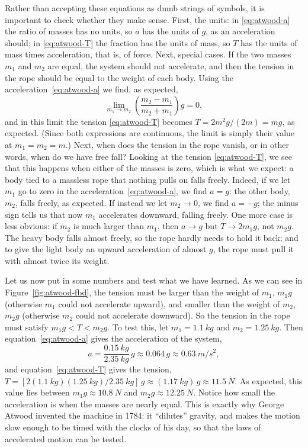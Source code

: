 \documentclass[11pt,a4paper]{article}
\begin{document}
Rather than accepting these equations as dumb strings of symbols, it is important to check whether
they make sense. First, the units: in \eqref{eq:atwood-a} the ratio of masses has no units, so $a$
has the units of $g$, as an acceleration should; in \eqref{eq:atwood-T} the fraction has the units
of mass, so $T$ has the units of mass times acceleration, that is, of force. Next, special cases. If
the two masses $m_1$ and $m_2$ are equal, the system should not accelerate, and then the tension in
the rope should be equal to the weight of each body. Using the acceleration~\eqref{eq:atwood-a} we
find, as expected,
\begin{equation}\label{eq:atwood-lim}
  \lim_{m_1 \to m_2} \left(\frac{m_2 - m_1}{m_2 + m_1}\right) g = 0 ,
\end{equation}
and in this limit the tension \eqref{eq:atwood-T} becomes $T = 2m^2 g/(2m) = mg$, as expected. (Since
both expressions are continuous, the limit is simply their value at $m_1 = m_2 = m$.) Next, when does
the tension in the rope vanish, or in other words, when do we have free fall? Looking at the tension
\eqref{eq:atwood-T}, we see that this happens when either of the masses is zero, which is what we
expect: a body tied to a massless rope that nothing pulls on falls freely. Indeed, if we let $m_1$ go
to zero in the acceleration~\eqref{eq:atwood-a}, we find $a = g$: the other body, $m_2$, falls freely,
as expected. If instead we let $m_2 \to 0$, we find $a = -g$; the minus sign tells us that now $m_1$
accelerates downward, falling freely. One more case is less obvious: if $m_2$ is much larger than
$m_1$, then $a \to g$ but $T \to 2m_1 g$, not $m_2 g$. The heavy body falls almost freely, so the rope
hardly needs to hold it back; and to give the light body an upward acceleration of almost $g$, the
rope must pull it with almost twice its weight.

Let us now put in some numbers and test what we have learned. As we can see
in Figure~\ref{fig:atwood-fbd}, the tension must be larger than the weight of $m_1$, $m_1 g$ (otherwise
$m_1$ could not accelerate upward), and smaller than the weight of $m_2$, $m_2 g$ (otherwise $m_2$
could not accelerate downward). So the tension in the rope must satisfy $m_1 g < T < m_2 g$. To test
this, let $m_1 = \qty{1.1}{kg}$ and $m_2 = \qty{1.25}{kg}$. Then equation~\eqref{eq:atwood-a} gives
the acceleration of the system,
\begin{equation}\label{eq:atwood-num}
  a = \frac{\qty{0.15}{kg}}{\qty{2.35}{kg}}\, g \approx 0.064\, g \approx \qty{0.63}{m/s^2} ,
\end{equation}
and equation~\eqref{eq:atwood-T} gives the tension, $T = [2(\qty{1.1}{kg})(\qty{1.25}{kg})/
\qty{2.35}{kg}]\,g \approx (\qty{1.17}{kg})\,g \approx \qty{11.5}{N}$. As expected, this value lies
between $m_1 g \approx \qty{10.8}{N}$ and $m_2 g \approx \qty{12.25}{N}$. Notice how small the
acceleration is when the masses are nearly equal. This is exactly why George Atwood invented the
machine in 1784: it ``dilutes'' gravity, and makes the motion slow enough to be timed with the clocks
of his day, so that the laws of accelerated motion can be tested.
\end{document}
